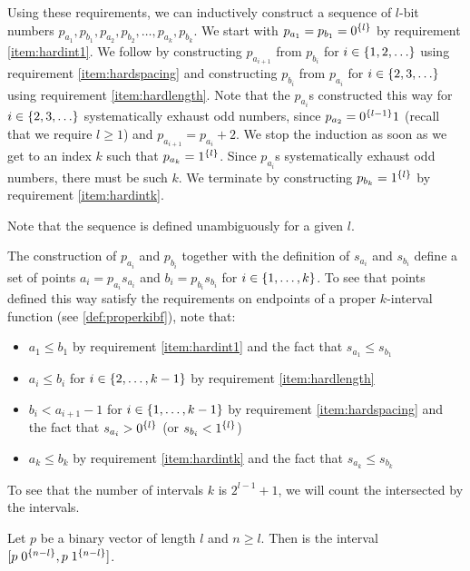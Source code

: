 Using these requirements,
we can inductively construct a sequence of $l$-bit numbers
$p_{a_1}, p_{b_1}, p_{a_2}, p_{b_2}, \ldots,
p_{a_k}, p_{b_k}$.
We start with
$p_{a_1} = p_{b_1} = 0^{\{l\}}$
by requirement \ref{item:hardint1}.
We follow by
constructing $p_{a_{i+1}}$ from $p_{b_i}$
for $i \in \{1, 2, \ldots\}$
using requirement \ref{item:hardspacing} and
constructing $p_{b_i}$ from $p_{a_i}$
for $i \in \{2, 3, \ldots\}$
using requirement \ref{item:hardlength}.
Note that the $p_{a_i}$s constructed this way
for $i \in \{2, 3, \ldots\}$
systematically
exhaust odd numbers,
since $p_{a_2} = 0^{\{l-1\}} 1$
(recall that we require $l \geq 1$)
and $p_{a_{i+1}} = p_{a_i} + 2$.
We stop the induction
as soon as we get to an index $k$ such that
$p_{a_k} = 1^{\{l\}}$.
Since $p_{a_i}$s systematically exhaust odd numbers,
there must be such $k$.
We terminate by constructing $p_{b_k} = 1^{\{l\}}$
by requirement \ref{item:hardintk}.

Note that the sequence is defined unambiguously
for a given $l$.

The construction of $p_{a_i}$ and $p_{b_i}$
together with the definition
of $s_{a_i}$ and $s_{b_i}$ define a set of points
$a_i = p_{a_i} s_{a_i}$ and $b_i = p_{b_i} s_{b_i}$
for $i \in \{1, \ldots, k\}$.
To see that points defined this way
satisfy the requirements on endpoints
of a proper $k$-interval function
(see \autoref{def:properkibf}),
note that:

\begin{itemize}
\item $a_1 \leq b_1$ by requirement \ref{item:hardint1}
and the fact that $s_{a_1} \leq s_{b_1}$
\item $a_i \leq b_i$
for $i \in \{2, \ldots, k-1\}$
by requirement \ref{item:hardlength}
\item $b_i < a_{i+1} - 1$
for $i \in \{1, \ldots, k-1\}$
by requirement \ref{item:hardspacing}
and the fact that $s_{a_i} > 0^{\{l\}}$
(or $s_{b_i} < 1^{\{l\}}$)
\item $a_k \leq b_k$ by requirement \ref{item:hardintk}
and the fact that $s_{a_k} \leq s_{b_k}$
\end{itemize}

To see that the number of intervals $k$ is $2^{l-1} + 1$,
we will count the 
intersected by the intervals.

\begin{definition}[Subtree]
Let $p$ be a binary vector of length $l$
and $n \geq l$.
Then  is the interval
$[p \; 0^{\{n-l\}}, p \; 1^{\{n-l\}}]$.
\end{definition}

